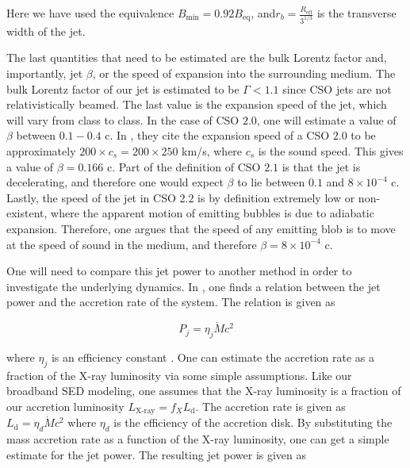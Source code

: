 Here we have used the equivalence $B_{\text{min}} = 0.92 B_{\text{eq}}$, and$r_b= \frac{R_{\text{eff}}}{3^{1/3}}$ is the transverse width of the jet. 


The last quantities that need to be estimated are the bulk Lorentz factor and, importantly, jet $\beta$, or the speed of expansion into the surrounding medium. The bulk Lorentz factor of our jet is estimated to be $\Gamma < 1.1$ since CSO jets are not relativistically beamed. The last value is the expansion speed of the jet, which will vary from class to class. In the case of CSO $2.0$, one will estimate a value of $\beta$ between $0.1 - 0.4$ c. In \cite{sullivan2024smallscale}, they cite the expansion speed of a CSO $2.0$ to be approximately $200 \times c_s = 200 \times 250$ km/s, where $c_s$ is the sound speed. This gives a value of $\beta = 0.166$ c. Part of the definition of CSO $2.1$ is that the jet is decelerating, and therefore one would expect $\beta$ to lie between $0.1$ and $8\times 10^{-4}$ c. Lastly, the speed of the jet in CSO $2.2$ is by definition extremely low or non-existent, where the apparent motion of emitting bubbles is due to adiabatic expansion. Therefore, one argues that the speed of any emitting blob is to move at the speed of sound in the medium, and therefore $\beta = 8\times 10^{-4}$ c. %

One will need to compare this jet power to another method in order to investigate the underlying dynamics. In \cite{Broderick_2015}, one finds a relation between the jet power and the accretion rate of the system. The relation is given as

\begin{equation}
    P_j = \eta_j \dot{M} c^2
\end{equation}

where $\eta_j$ is an efficiency constant . One can estimate the accretion rate as a fraction of the X-ray luminosity via some simple assumptions. Like our broadband SED modeling, one assumes that the X-ray luminosity is a fraction of our accretion luminosity $L_{\text{X-ray}} = f_X L_{\text{d}}$. The accretion rate is given as $L_{\text{d}} = \eta_d \dot{M} c^2$ where $\eta_d$ is the efficiency of the accretion disk. By substituting the mass accretion rate as a function of the X-ray luminosity, one can get a simple estimate for the jet power. The resulting jet power is given as

